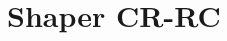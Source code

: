 \documentclass[a4paper,11pt]{article} %
\begin{document}
\section{Shaper CR-RC}\label{s:shaper} 
%
%
%
%
%
\end{document}
